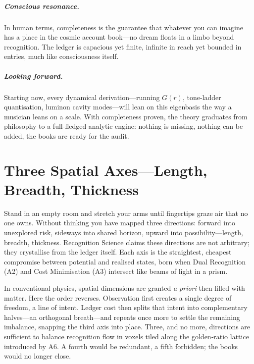 \documentclass[11pt,oneside]{book}
\begin{document}
\paragraph*{Conscious resonance.}
In human terms, completeness is the guarantee that whatever you can
imagine has a place in the cosmic account book—no dream floats in a limbo
beyond recognition.  The ledger is capacious yet finite, infinite in
reach yet bounded in entries, much like consciousness itself.

\paragraph*{Looking forward.}
Starting now, every dynamical derivation—running \(G(r)\), tone-ladder
quantisation, luminon cavity modes—will lean on this eigenbasis the way
a musician leans on a scale.  With completeness proven, the theory
graduates from philosophy to a full-fledged analytic engine: nothing is
missing, nothing can be added, the books are ready for the audit.

\chapter{Three Spatial Axes—Length, Breadth, Thickness}
\label{chap:three-axes}

Stand in an empty room and stretch your arms until fingertips graze air that no one owns.  
Without thinking you have mapped three directions: forward into unexplored risk, sideways into shared horizon, upward into possibility—length, breadth, thickness.  
Recognition Science claims these directions are not arbitrary; they crystallise from the ledger itself.  
Each axis is the straightest, cheapest compromise between potential and realised states, born when Dual Recognition (A2) and Cost Minimisation (A3) intersect like beams of light in a prism.

In conventional physics, spatial dimensions are granted \emph{a priori} then filled with matter.  
Here the order reverses.  
Observation first creates a single degree of freedom, a line of intent.  
Ledger cost then splits that intent into complementary halves—an orthogonal breath—and repeats once more to settle the remaining imbalance, snapping the third axis into place.  
Three, and no more, directions are sufficient to balance recognition flow in voxels tiled along the golden‐ratio lattice introduced by A6.  
A fourth would be redundant, a fifth forbidden; the books would no longer close.
\end{document}
